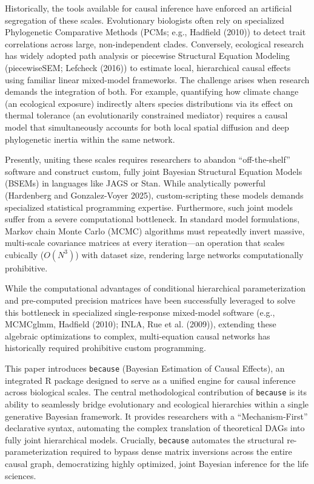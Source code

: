 \documentclass[
]{article}
\begin{document}
Historically, the tools available for causal inference have enforced an artificial segregation of these scales. Evolutionary biologists often rely on specialized Phylogenetic Comparative Methods (PCMs; e.g., Hadfield (2010)) to detect trait correlations across large, non-independent clades. Conversely, ecological research has widely adopted path analysis or piecewise Structural Equation Modeling (piecewiseSEM; Lefcheck (2016)) to estimate local, hierarchical causal effects using familiar linear mixed-model frameworks. The challenge arises when research demands the integration of both. For example, quantifying how climate change (an ecological exposure) indirectly alters species distributions via its effect on thermal tolerance (an evolutionarily constrained mediator) requires a causal model that simultaneously accounts for both local spatial diffusion and deep phylogenetic inertia within the same network.

Presently, uniting these scales requires researchers to abandon ``off-the-shelf'' software and construct custom, fully joint Bayesian Structural Equation Models (BSEMs) in languages like JAGS or Stan. While analytically powerful (Hardenberg and Gonzalez-Voyer 2025), custom-scripting these models demands specialized statistical programming expertise. Furthermore, such joint models suffer from a severe computational bottleneck. In standard model formulations, Markov chain Monte Carlo (MCMC) algorithms must repeatedly invert massive, multi-scale covariance matrices at every iteration---an operation that scales cubically (\(O(N^3)\)) with dataset size, rendering large networks computationally prohibitive.

While the computational advantages of conditional hierarchical parameterization and pre-computed precision matrices have been successfully leveraged to solve this bottleneck in specialized single-response mixed-model software (e.g., MCMCglmm, Hadfield (2010); INLA, Rue et al. (2009)), extending these algebraic optimizations to complex, multi-equation causal networks has historically required prohibitive custom programming.

This paper introduces \texttt{because} (Bayesian Estimation of Causal Effects), an integrated R package designed to serve as a unified engine for causal inference across biological scales. The central methodological contribution of \texttt{because} is its ability to seamlessly bridge evolutionary and ecological hierarchies within a single generative Bayesian framework. It provides researchers with a ``Mechanism-First'' declarative syntax, automating the complex translation of theoretical DAGs into fully joint hierarchical models. Crucially, \texttt{because} automates the structural re-parameterization required to bypass dense matrix inversions across the entire causal graph, democratizing highly optimized, joint Bayesian inference for the life sciences.
\end{document}
